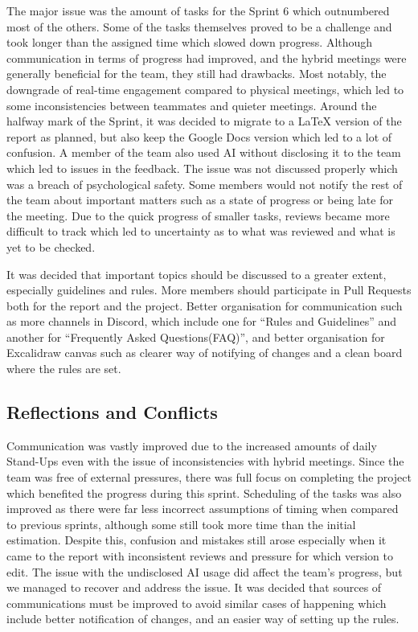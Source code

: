 The major issue was the amount of tasks for the Sprint 6 which outnumbered most of the others. Some of the tasks themselves proved to be a challenge and took longer than the assigned time which slowed down progress. Although communication in terms of progress had improved, and the hybrid meetings were generally beneficial for the team, they still had drawbacks. Most notably, the downgrade of real-time engagement compared to physical meetings, which led to some inconsistencies between teammates and quieter meetings. Around the halfway mark of the Sprint, it was decided to migrate to a LaTeX version of the report as planned, but also keep the Google Docs version which led to a lot of confusion. A member of the team also used AI without disclosing it to the team which led to issues in the feedback. The issue was not discussed properly which was a breach of psychological safety. Some members would not notify the rest of the team about important matters such as a state of progress or being late for the meeting. Due to the quick progress of smaller tasks, reviews became more difficult to track which led to uncertainty as to what was reviewed and what is yet to be checked.
\par

It was decided that important topics should be discussed to a greater extent, especially guidelines and rules. More members should participate in Pull Requests both for the report and the project. Better organisation for communication such as more channels in Discord, which include one for “Rules and Guidelines” and another for “Frequently Asked Questions(FAQ)”, and better organisation for Excalidraw canvas such as clearer way of notifying of changes and a clean board where the rules are set. 



\subsection*{Reflections and Conflicts}
Communication was vastly improved due to the increased amounts of daily Stand-Ups even with the issue of inconsistencies with hybrid meetings. Since the team was free of external pressures, there was full focus on completing the project which benefited the progress during this sprint. Scheduling of the tasks was also improved as there were far less incorrect assumptions of timing when compared to previous sprints, although some still took more time than the initial estimation. Despite this, confusion and mistakes still arose especially when it came to the report with inconsistent reviews and pressure for which version to edit. The issue with the undisclosed AI usage did affect the team's progress, but we managed to recover and address the issue. It was decided that sources of communications must be improved to avoid similar cases of happening which include better notification of changes, and an easier way of setting up the rules.
